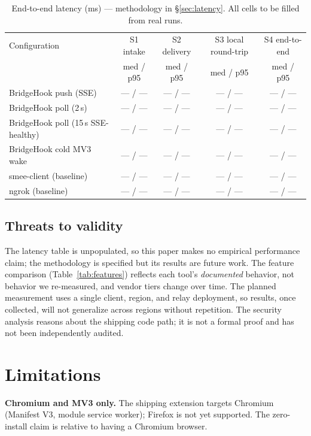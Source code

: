 \documentclass[11pt]{article}
\begin{document}
\begin{table}[t]
\centering
\caption{End-to-end latency (ms) --- methodology in \S\ref{sec:latency}. All
cells to be filled from real runs.}
\label{tab:latency}
\begin{tabular}{lcccc}
\toprule
Configuration & S1 intake & S2 delivery & S3 local round-trip & S4 end-to-end \\
     & med / p95 & med / p95 & med / p95 & med / p95 \\
\midrule
BridgeHook push (SSE)       & --- / --- & --- / --- & --- / --- & --- / --- \\
BridgeHook poll (2\,s)      & --- / --- & --- / --- & --- / --- & --- / --- \\
BridgeHook poll (15\,s SSE-healthy) & --- / --- & --- / --- & --- / --- & --- / --- \\
BridgeHook cold MV3 wake    & --- / --- & --- / --- & --- / --- & --- / --- \\
\midrule
smee-client (baseline)      & --- / --- & --- / --- & --- / --- & --- / --- \\
ngrok (baseline)            & --- / --- & --- / --- & --- / --- & --- / --- \\
\bottomrule
\end{tabular}
\end{table}

\subsection{Threats to validity}
\label{sec:threats}
The latency table is unpopulated, so this paper makes no empirical performance
claim; the methodology is specified but its results are future work. The feature
comparison (Table~\ref{tab:features}) reflects each tool's \emph{documented}
behavior, not behavior we re-measured, and vendor tiers change over time. The
planned measurement uses a single client, region, and relay deployment, so
results, once collected, will not generalize across regions without repetition.
The security analysis reasons about the shipping code path; it is not a formal
proof and has not been independently audited.

\section{Limitations}
\label{sec:limits}

\textbf{Chromium and MV3 only.} The shipping extension targets Chromium
(Manifest V3, module service worker); Firefox is not yet supported. The
zero-install claim is relative to having a Chromium browser.
\end{document}
